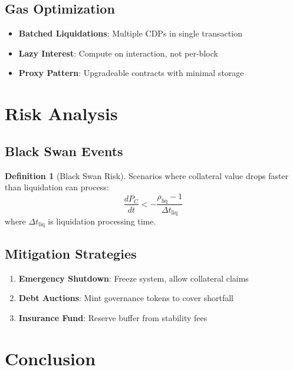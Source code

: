 \documentclass[11pt,a4paper]{article}
\theoremstyle{definition}
\newtheorem{definition}{Definition}
\begin{document}
\subsection{Gas Optimization}

\begin{itemize}
\item \textbf{Batched Liquidations}: Multiple CDPs in single transaction
\item \textbf{Lazy Interest}: Compute on interaction, not per-block
\item \textbf{Proxy Pattern}: Upgradeable contracts with minimal storage
\end{itemize}

\section{Risk Analysis}

\subsection{Black Swan Events}

\begin{definition}[Black Swan Risk]
Scenarios where collateral value drops faster than liquidation can process:
\begin{equation}
\frac{dP_C}{dt} < -\frac{\rho_{\text{liq}} - 1}{\Delta t_{\text{liq}}}
\end{equation}
where $\Delta t_{\text{liq}}$ is liquidation processing time.
\end{definition}

\subsection{Mitigation Strategies}

\begin{enumerate}
\item \textbf{Emergency Shutdown}: Freeze system, allow collateral claims
\item \textbf{Debt Auctions}: Mint governance tokens to cover shortfall
\item \textbf{Insurance Fund}: Reserve buffer from stability fees
\end{enumerate}

\section{Conclusion}
\end{document}
